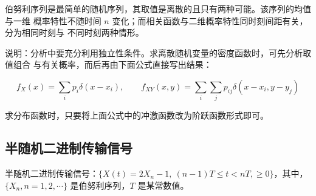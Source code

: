 \documentclass[11pt,openany,UTF8]{ctexbook}
\begin{document}
伯努利序列是最简单的随机序列\nobreak，其取值是离散的且只有两种可能\nobreak。该序列的均值与一维
概率特性不随时间 $n$ 变化\nobreak；而相关函数与二维概率特性同时刻间距有关\nobreak，分为相同时刻与
不同时刻两种情形\nobreak。

说明\nobreak：分析中要充分利用独立性条件\nobreak。求离散随机变量的密度函数时\nobreak，可先分析取值组合
与有关概率\nobreak，而后再由下面公式直接写出结果\nobreak：

\[
f_X(x) = \sum_i p_i\delta(x-x_i),\qquad
f_{XY}(x,y) = \sum_i\sum_j p_{ij}\delta(x-x_i,y-y_j)
\]

求分布函数时\nobreak，只要将上面公式中的冲激函数改为阶跃函数形式即可\nobreak。

\subsection{半随机二进制传输信号}
半随机二进制传输信号\nobreak：$\{X(t)=2X_n-1,\ (n-1)T\leqslant t<nT,\geqslant 0\}$\nobreak，其中\nobreak，
$\{X_n,n=1,2,\cdots\}$%
是伯努利序列\nobreak，$T$ 是某常数值\nobreak。
\end{document}

